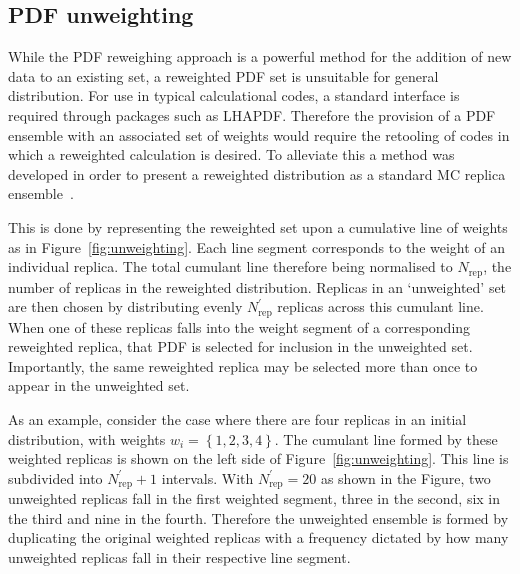 \subsection{PDF unweighting}

While the PDF reweighing approach is a powerful method for the addition of new data to an existing set, a reweighted PDF set is unsuitable for general distribution. For use in typical calculational codes, a standard interface is required through packages such as LHAPDF. Therefore the provision of a PDF ensemble with an  associated set of weights would require the retooling of codes in which a reweighted calculation is desired. To alleviate this a method was developed in order to present a reweighted distribution as a standard MC replica ensemble~\cite{Ball:2011gg}.

This is done by representing the reweighted set upon a cumulative line of weights as in Figure~\ref{fig:unweighting}. Each line segment corresponds to the weight of an individual replica. The total cumulant line therefore being normalised to $N_{\text{rep}}$, the number of replicas in the reweighted distribution. Replicas in an `unweighted' set are then chosen by distributing evenly $N_{\text{rep}}^\prime$ replicas across this cumulant line. When one of these replicas falls into the weight segment of a corresponding reweighted replica, that PDF is selected for inclusion in the unweighted set. Importantly, the same reweighted replica may be selected more than once to appear in the unweighted set.

As an example, consider the case where there are four replicas in an initial distribution, with weights $w_i = \left\{ 1, 2, 3, 4 \right\} $. The cumulant line formed by these weighted replicas is shown on the left side of Figure~\ref{fig:unweighting}. This line is subdivided into $N_{\text{rep}}^\prime + 1$ intervals. With $N_{\text{rep}}^\prime = 20$ as shown in the Figure, two unweighted replicas fall in the first weighted segment, three in the second, six in the third and nine in the fourth. Therefore the unweighted ensemble is formed by duplicating the original weighted replicas with a frequency dictated by how many unweighted replicas fall in their respective line segment.


